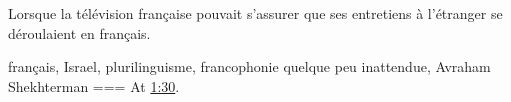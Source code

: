 Lorsque la télévision française pouvait s'assurer que ses entretiens à l'étranger se déroulaient en français.

français, Israel, plurilinguisme, francophonie quelque peu inattendue, Avraham Shekhterman
===
At \href{https://youtu.be/JwRLT5tXwEM?feature=shared&t=90 }{1:30}.